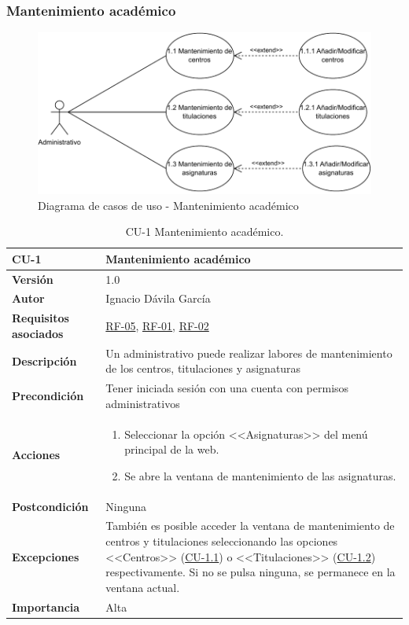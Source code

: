 \subsubsection{Mantenimiento académico}
\begin{figure}[!h]
	\centering
	\includegraphics[scale=0.85]{../img/Anexos/Casos uso/Diagrama casos de uso 2.pdf}
	\caption{Diagrama de casos de uso - Mantenimiento académico}
\end{figure}
\FloatBarrier

\begin{table}[p]
	\centering
	\begin{tabularx}{\linewidth}{ p{} p{} }
		\toprule
		\textbf{CU-1}    & \textbf{Mantenimiento académico}\\
		\toprule
		\textbf{Versión}              & 1.0    \\
		\textbf{Autor}                & Ignacio Dávila García \\
		\textbf{Requisitos asociados} & \hyperref[itm:RF5]{RF-05}, \hyperref[itm:RF1]{RF-01}, \hyperref[itm:RF2]{RF-02} \\
		\textbf{Descripción}          & Un administrativo puede realizar labores de mantenimiento de los centros, titulaciones y asignaturas \\
		\textbf{Precondición}         & Tener iniciada sesión con una cuenta con permisos administrativos \\
		\textbf{Acciones}             &
		\begin{enumerate}
			\def\labelenumi{\arabic{enumi}.}
			\tightlist
			\item Seleccionar la opción <<Asignaturas>> del menú principal de la web.
			\item Se abre la ventana de mantenimiento de las asignaturas.
		\end{enumerate}\\
		\textbf{Postcondición}        & Ninguna \\
		\textbf{Excepciones}          & También es posible acceder la ventana de mantenimiento de centros y titulaciones seleccionando las opciones <<Centros>> (\hyperref[table:CU-1.1]{CU-1.1}) o <<Titulaciones>> (\hyperref[table:CU-1.2]{CU-1.2}) respectivamente. Si no se pulsa ninguna, se permanece en la ventana actual. \\
		\textbf{Importancia}          & Alta \\
		\bottomrule
	\end{tabularx}
	\caption{CU-1 Mantenimiento académico.}
\end{table}
\FloatBarrier

